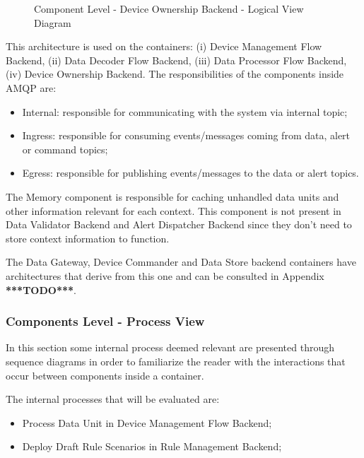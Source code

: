 \begin{figure}[H]
   \centering
   \resizebox{\columnwidth}{!}
   {
      
   }
   \caption[Component Level - Device Ownership Backend - Logical View Diagram]{Component Level - Device Ownership Backend - Logical View Diagram}
   \label{fig:design:architecture:component:logical:diagram:ownership}
\end{figure}

This architecture is used on the containers: (i) Device Management Flow Backend, (ii) Data Decoder Flow Backend, (iii) Data Processor Flow Backend, (iv) Device Ownership Backend. The responsibilities of the components inside AMQP are:

\begin{itemize}
   \item Internal: responsible for communicating with the system via internal topic; 
   \item Ingress: responsible for consuming events/messages coming from data, alert or command topics;
   \item Egress: responsible for publishing events/messages to the data or alert topics.
\end{itemize}

The Memory component is responsible for caching unhandled data units and other information relevant for each context. This component is not present in Data Validator Backend and Alert Dispatcher Backend since they don't need to store context information to function.

The Data Gateway, Device Commander and Data Store backend containers have architectures that derive from this one and can be consulted in Appendix \textbf{***TODO***}.

\subsubsection*{Components Level - Process View}
\label{subsubsec:design:architecture:components:process}

In this section some internal process deemed relevant are presented through sequence diagrams in order to familiarize the reader with the interactions that occur between components inside a container.

The internal processes that will be evaluated are:

\begin{itemize}
   \item Process Data Unit in Device Management Flow Backend;
   \item Deploy Draft Rule Scenarios in Rule Management Backend;
\end{itemize}

